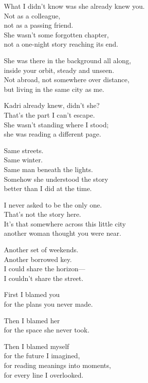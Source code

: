 \begin{lyrics}
What I didn't know was she already knew you.\\
Not as a colleague,\\
not as a passing friend.\\
She wasn't some forgotten chapter,\\
not a one-night story reaching its end.

She was there in the background all along,\\
inside your orbit, steady and unseen.\\
Not abroad, not somewhere over distance,\\
but living in the same city as me.


Kadri already knew, didn't she?\\
That's the part I can't escape.\\
She wasn't standing where I stood;\\
she was reading a different page.

Same streets.\\
Same winter.\\
Same man beneath the lights.\\
Somehow she understood the story\\
better than I did at the time.


I never asked to be the only one.\\
That's not the story here.\\
It's that somewhere across this little city\\
another woman thought you were near.

Another set of weekends.\\
Another borrowed key.\\
I could share the horizon—\\
I couldn't share the street.


First I blamed you\\
for the plans you never made.

Then I blamed her\\
for the space she never took.

Then I blamed myself\\
for the future I imagined,\\
for reading meanings into moments,\\
for every line I overlooked.


\end{lyrics}
